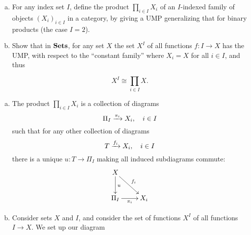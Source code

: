 \clearpage
\begin{BookProblem}{14}
  \begin{enumerate}[(a)]
    \item For any index set \(I\), define the product \(\prod_{i \in I}X_i\) of
      an \(I\)-indexed family of objects \((X_i)_{i \in I}\) in a category, by
      giving a UMP generalizing that for binary products (the case \(I = 2\)).
    \item Show that in \(\mathbf{{Sets}}\), for any set \(X\) the set \(X^I\) of all
      functions \(f : I \to X\) has the UMP, with respect to the ``constant
      family'' where \(X_i = X\) for all \(i \in I\), and thus

      \[X^I \cong \prod_{i \in I}X.\]
  \end{enumerate}
  \begin{Solution}
    \begin{enumerate}[(a)]
      \item The product \(\prod_{i \in I} X_i\) is a collection of diagrams
        \begin{equation}
          \Pi_I \xrightarrow{\pi_i}X_i,\quad i \in I
        \end{equation}
        such that for any other collection of diagrams
        \begin{equation}
          T \xrightarrow{f_i}X_i,\quad i \in I
        \end{equation}
        there is a unique \(u : T \to \Pi_I\) making all induced subdiagrams
        commute:
        \begin{equation}
          \xymatrix{
            X\ar[d]^u\ar[dr]^{f_i} & \\
            \Pi_I\ar[r]_{\pi_i} & X_i
          }
        \end{equation}

      \item Consider sets \(X\) and \(I\), and consider the set of functions
        \(X^I\) of all functions \(I \to X\). We set up our diagram
        \begin{equation}
        \end{equation}
    \end{enumerate}

  \end{Solution}
\end{BookProblem}

